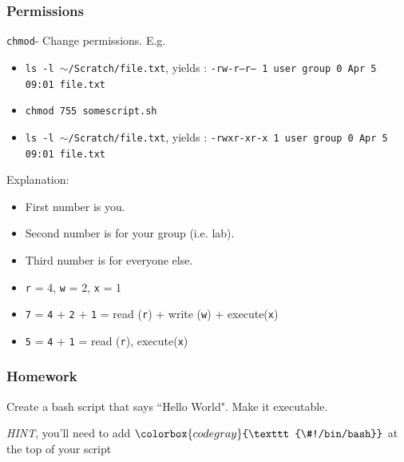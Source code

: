 \documentclass{beamer}
\newcommand{\code}[1]{\colorbox{codegray}{\texttt{#1}}}
\begin{document}
\begin{frame}
\frametitle{Permissions}
\code{chmod}- Change permissions.
E.g.
\begin{itemize}
    \item \code{ls -l $\sim$/Scratch/file.txt}, yields : 
    \hspace{5mm} \code{-rw-r--r--  1 user group 0 Apr  5 09:01 file.txt}
    \smallskip
    \item \code{chmod 755 somescript.sh}
    \bigskip
    \item \code{ls -l $\sim$/Scratch/file.txt}, yields : 
    \hspace{5mm} \code{-rwxr-xr-x  1 user group 0 Apr  5 09:01 file.txt}
\end{itemize}
\bigskip

Explanation:
\begin{itemize}
    \item First number is you.
    \item Second number is for your group (i.e. lab).
    \item Third number is for everyone else.
    \item \code{r} = 4, \code{w} = 2, \code{x} = 1
    \item \code{7} = \code{4} + \code{2} + \code{1} = read (\code{r}) + write (\code{w}) +  execute(\code{x})
    \item \code{5} = \code{4} + \code{1} = read (\code{r}), execute(\code{x})
\end{itemize}
\end{frame}

\begin{frame}
\frametitle{Homework}
Create a bash script that says ``Hello World". Make it executable. 

\bigskip

\emph{HINT}, you'll need to add $\code{\#^^21/bin/bash}$ at the top of your script
\end{frame}
\end{document}
